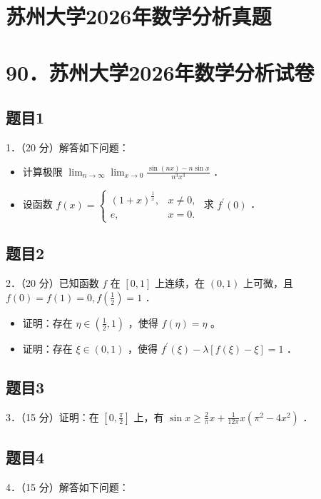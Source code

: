 \documentclass{article}
\begin{document}
\section*{苏州大学2026年数学分析真题}
\section*{90．苏州大学2026年数学分析试卷}

\subsection{题目1}
1．（20 分）解答如下问题：

\begin{itemize}
  \item[（1）] 计算极限 \(\lim _{n \rightarrow \infty} \lim _{x \rightarrow 0} \frac{\sin (n x)-n \sin x}{n^{3} x^{3}}\) ．
  \item[（2）] 设函数 \(f(x)=\left\{\begin{array}{ll}(1+x)^{\frac{1}{x}}, & x \neq 0, \\ e, & x=0 .\end{array}\right.\) 求 \(f^{\prime}(0)\) ．
\end{itemize}

\subsection{题目2}
2．（20 分）已知函数 \(f\) 在 \([0,1]\) 上连续，在 \((0,1)\) 上可微，且 \(f(0)=f(1)=0, f\left(\frac{1}{2}\right)=1\) ．

\begin{itemize}
  \item[（1）] 证明：存在 \(\eta \in\left(\frac{1}{2}, 1\right)\) ，使得 \(f(\eta)=\eta\) 。
  \item[（2）] 证明：存在 \(\xi \in(0,1)\) ，使得 \(f^{\prime}(\xi)-\lambda[f(\xi)-\xi]=1\) ．
\end{itemize}

\subsection{题目3}
3．（15 分）证明：在 \(\left[0, \frac{\pi}{2}\right]\) 上，有 \(\sin x \geq \frac{2}{\pi} x+\frac{1}{12 \pi} x\left(\pi^{2}-4 x^{2}\right)\) ．

\subsection{题目4}
4．（15 分）解答如下问题：
\end{document}
